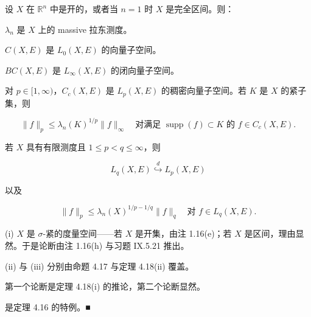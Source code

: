 \begin{theorem}

设 $ X $ 在 $ \mathbb{R}^{n} $ 中是开的，或者当 $ n = 1 $ 时 $ X $ 是完全区间。则：

\begin{subitems}
\item

$ \lambda_{n} $ 是 $ X $ 上的 massive 拉东测度。

\item

$ C(X,E) $ 是 $ L_{0}(X,E) $ 的向量子空间。

\item

$ BC(X,E) $ 是 $ L_{\infty}(X,E) $ 的闭向量子空间。

\item

对 $ p \in [1,\infty) $，$ C_{c}(X,E) $ 是 $ L_{p}(X,E) $ 的稠密向量子空间。若 $ K $ 是 $ X $ 的紧子集，则

\[
\|f\|_{p} \le \lambda_{n}(K)^{1/p}\|f\|_{\infty} \quad \text{对满足 } \operatorname{supp}(f) \subset K \text{ 的 } f \in C_{c}(X,E) .
\]
\item

若 $ X $ 具有有限测度且 $ 1 \le p < q \le \infty $，则

\[
L_{q}(X,E) \overset{d}{\hookrightarrow} L_{p}(X,E)
\]

以及

\[
\|f\|_{p} \le \lambda_{n}(X)^{1/p-1/q}\|f\|_{q} \quad \text{对 } f \in L_{q}(X,E) .
\]

\proofhead
(i) $ X $ 是 $ \sigma $-紧的度量空间——若 $ X $ 是开集，由注 1.16(e)；若 $ X $ 是区间，理由显然。于是论断由注 1.16(h) 与习题 IX.5.21 推出。
\end{subitems}

(ii) 与 (iii) 分别由命题 4.17 与定理 4.18(ii) 覆盖。

\begin{subitems}
\item[（iv）]

第一个论断是定理 4.18(i) 的推论，第二个论断显然。

\item[（v）]

是定理 4.16 的特例。\nobreak\hspace{0.35em}■

\end{subitems}

\end{theorem}

